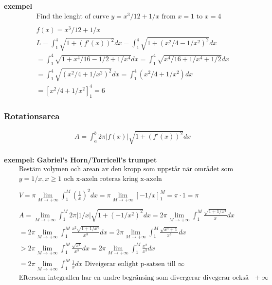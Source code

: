 \documentclass{article}
\begin{document}
\textbf{exempel}
\begin{align*}
  &\quad  \text{Find the lenght of curve } y=x^3/12+1/x \text{ from } x=1 \text{ to } x=4  \\
  &\quad  \\
  &\quad  f(x)=x^3/12+1/x  \\
  &\quad  L = \int_1^4\sqrt{1+{(f'(x))}^2}dx = \int_1^4\sqrt{1+{(x^2/4-1/x^2)}^2}dx \\
  &\quad  = \int_1^4\sqrt{1+x^4/16-1/2+1/x^4}dx = \int_1^4\sqrt{x^4/16+1/x^4+1/2}dx \\
  &\quad  = \int_1^4\sqrt{{(x^2/4+1/x^2)}^2}dx = \int_1^4(x^2/4+1/x^2)dx \\
  &\quad  = {[x^2/4+1/x^2]}_1^4 = 6
\end{align*}

\newpage

\subsubsection{Rotationsarea}
\begin{align*}
  &\quad  A = \int_a^b 2\pi|f(x)|\sqrt{1+{(f'(x))}^2} dx \\
\end{align*}

\textbf{exempel: Gabriel's Horn/Torricell's trumpet }
\begin{align*}
  &\quad  \text{Bestäm volymen och arean av den kropp som uppstår när området som begränsas av kurvan } \\
  &\quad  y = 1/x, x\geq1 \text{ och x-axeln roteras kring x-axeln} \\
  &\quad  \\
  &\quad  V=\pi \lim_{M\to+\infty} \int_1^M {(\frac{1}{x})}^2 dx = \pi \lim_{M\to+\infty}{[-1/x]}_1^M
  = \pi\cdot1 = \pi \\
  &\quad  \\
  &\quad  A = \lim_{M\to+\infty}\int_1^M 2\pi|1/x|\sqrt{1+{(-1/x^2)}^2} dx
  = 2\pi \lim_{M\to+\infty}\int_1^M \frac{\sqrt{1+1/x^4}}{x} dx \\
  &\quad = 2\pi \lim_{M\to+\infty}\int_1^M \frac{x^2\sqrt{1+1/x^4}}{x^3} dx 
  = 2\pi \lim_{M\to+\infty}\int_1^M \frac{\sqrt{x^4+1}}{x^3} dx \\
  &\quad > 2\pi \lim_{M\to+\infty}\int_1^M \frac{\sqrt{x^4}}{x^3} dx
  = 2\pi \lim_{M\to+\infty}\int_1^M \frac{x^2}{x^3} dx \\
  &\quad = 2\pi \lim_{M\to+\infty}\int_1^M \frac{1}{x} dx  \text{ Diveigerar enlight p-satsen till } \infty \\
  &\quad \text{Eftersom integrallen har en undre begränsing som divergerar divegerar också integrallen till}
  +\infty \\
\end{align*}
\end{document}
